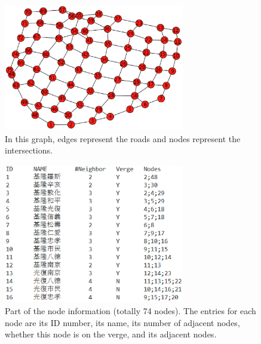 \documentclass{sig-alternate}
\begin{document}
\begin{figure}
\centering
\includegraphics[height=2.2in, width=3.1in]{graphexample.eps}
\caption{In this graph, edges represent the roads and nodes represent the intersections.}
\label{fig:graphex}
\end{figure}

\begin{figure}
\centering
\includegraphics[height=2.4in, width=3.1in]{node.eps}
\caption{Part of the node information (totally 74 nodes). The entries for each node are its ID number, its name, its number of adjacent nodes, whether this node is on the verge, and its adjacent nodes.}
\label{fig:node}
\end{figure}
\end{document}
